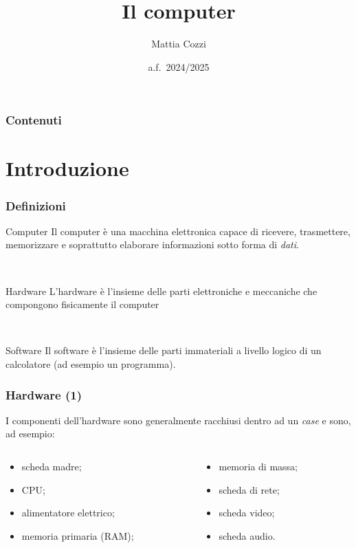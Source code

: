 \documentclass[handout]{beamer}
\title{Il computer}
\author{Mattia Cozzi}
\date{a.f.~2024/2025}
\begin{document}
\begin{frame}
  \titlepage
\end{frame}


\begin{frame}
\frametitle{Contenuti}
\tableofcontents
\end{frame}

\section{Introduzione}

\begin{frame}
\frametitle{Definizioni}
\begin{block}{Computer}
  Il computer è una macchina elettronica capace di ricevere, trasmettere, memorizzare e soprattutto elaborare informazioni sotto forma di \emph{dati}.
\end{block}\pause

~

\begin{block}{Hardware}
  L'hardware è l'insieme delle parti elettroniche e meccaniche che compongono fisicamente il computer
\end{block}\pause

~

\begin{block}{Software}
  Il software è l'insieme delle parti immateriali a livello logico di un calcolatore (ad esempio un programma).
\end{block}
\end{frame}



\begin{frame}
\frametitle{Hardware (1)}
I componenti dell'hardware sono generalmente racchiusi dentro ad un \emph{case}{\pause} e sono, ad esempio:
\begin{columns}
  \begin{column}{0.4\textwidth}
    \begin{itemize}
      \item scheda madre;\pause
      \item CPU;\pause
      \item alimentatore elettrico;\pause
      \item memoria primaria (RAM);\pause
    \end{itemize}
    \end{column}
  \begin{column}{0.4\textwidth}
    \begin{itemize}
      \item memoria di massa;\pause
      \item scheda di rete;\pause
      \item scheda video;\pause
      \item scheda audio.
    \end{itemize}
    \end{column}
\end{columns}
\end{frame}
\end{document}
